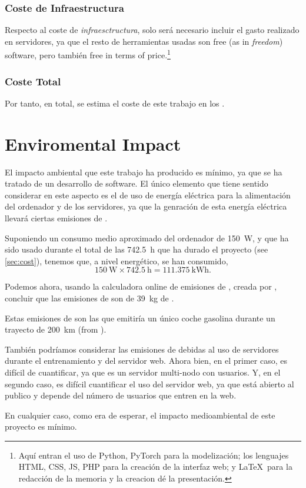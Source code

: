 \subsubsection{Coste de Infraestructura}

Respecto al coste de \emph{infraesctructura}, solo será necesario incluir el
gasto realizado en servidores, ya que el resto de herramientas usadas son free
(as in \emph{freedom}) software, pero también free in terms of
price.\footnote{Aquí entran el uso de Python, PyTorch para la modelización; los
  lenguajes HTML, CSS, JS, PHP para la creación de la interfaz web; y \LaTeX\
  para la redacción de la memoria y la creacion dé la presentación.}

\subsubsection{Coste Total}

Por tanto, en total, se estima el coste de este trabajo en los .



\section{Enviromental Impact}\label{sec:enviromental}

El impacto ambiental que este trabajo ha producido es mínimo, ya que se ha
tratado de un desarrollo de software. El único elemento que tiene sentido
considerar en este aspecto es el de uso de energía eléctrica para la
alimentación del ordenador y de los servidores, ya que la genración de esta
energía eléctrica llevará ciertas emisiones de \ch{CO2}.

Suponiendo un consumo medio aproximado del ordenador de \SI{150}{\watt}, y que
ha sido usado durante el total de las \SI{742.5}{\hour} que ha durado el
proyecto (see \vref{sec:cost}), tenemos que, a nivel energético, se han
consumido,
\begin{equation}
  \SI{150}{\watt} \times \SI{742.5}{\hour} = \SI{111.375}{\kWh}.
\end{equation}

Podemos ahora, usando la calculadora online de emisiones de , creada
por \myCite{aragon21:emiss_calcul}, concluir que las emisiones de \ch{CO2} son
de \SI{39}{\kg} de \ch{CO2}.

\begin{exampleBox}
  Estas emisiones de  son las que emitiría un único coche gasolina
  durante un trayecto de \SI{200}{\km} (from \cite{aragon21:emiss_calcul}).
\end{exampleBox}

También podríamos considerar las emisiones de  debidas al uso de
servidores durante el entrenamiento y del servidor web. Ahora bien, en el
primer caso, es difícil de cuantificar, ya que es un servidor multi-nodo con
usuarios. Y, en el segundo caso, es difícil cuantificar el uso del servidor
web, ya que está abierto al publico y depende del número de usuarios que entren
en la web.

En cualquier caso, como era de esperar, el impacto medioambiental de este
proyecto es mínimo.